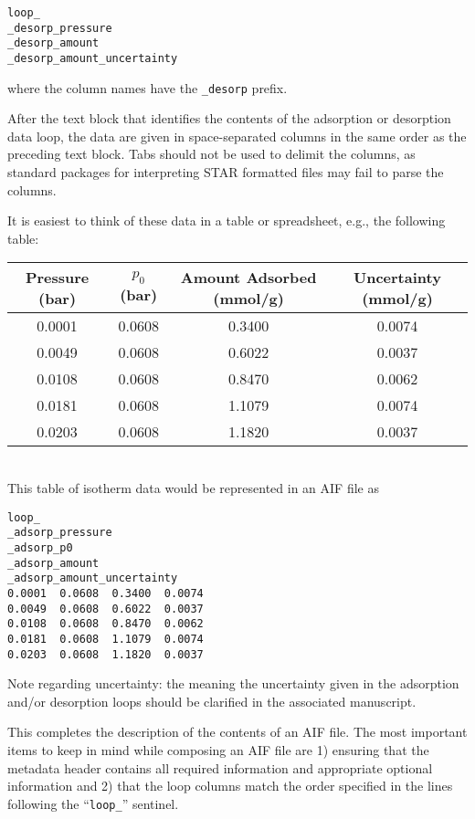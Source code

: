 \documentclass[preprint,pre,showkeys,12pt,superscriptaddress,nofootinbib,endfloats*]{revtex4-1}
\begin{document}
\begin{verbatim}
loop_
_desorp_pressure
_desorp_amount
_desorp_amount_uncertainty
\end{verbatim}

\noindent where the column names have the \verb!_desorp! prefix.

After the text block that identifies the contents of the adsorption or desorption data loop, the data are given in space-separated columns in the same order as the preceding text block. Tabs should not be used to delimit the columns, as standard packages for interpreting STAR formatted files may fail to parse the columns.

It is easiest to think of these data in a table or spreadsheet, e.g., the following table:\\

\begin{tabular}{|c|c|c|c|}
  \hline
  \textbf{Pressure (bar)} & \textbf{$p_0$ (bar)} & \textbf{Amount Adsorbed (mmol/g)} & \textbf{Uncertainty (mmol/g)}\\
  \hline
  0.0001 & 0.0608 & 0.3400 & 0.0074\\ \hline
  0.0049 & 0.0608 & 0.6022 & 0.0037\\ \hline
  0.0108 & 0.0608 & 0.8470 & 0.0062\\ \hline
  0.0181 & 0.0608 & 1.1079 & 0.0074\\ \hline
  0.0203 & 0.0608 & 1.1820 & 0.0037\\ \hline
\end{tabular}\\

\noindent This table of isotherm data would be represented in an AIF file as

\begin{verbatim}
loop_
_adsorp_pressure
_adsorp_p0
_adsorp_amount
_adsorp_amount_uncertainty
0.0001  0.0608  0.3400  0.0074
0.0049  0.0608  0.6022  0.0037
0.0108  0.0608  0.8470  0.0062
0.0181  0.0608  1.1079  0.0074
0.0203  0.0608  1.1820  0.0037
\end{verbatim}

Note regarding uncertainty: the meaning the uncertainty given in the adsorption and/or desorption loops should be clarified in the associated manuscript.

This completes the description of the contents of an AIF file. The most important items to keep in mind while composing an AIF file are 1) ensuring that the metadata header contains all required information and appropriate optional information and 2) that the loop columns match the order specified in the lines following the ``\verb!loop_!'' sentinel.
\end{document}
